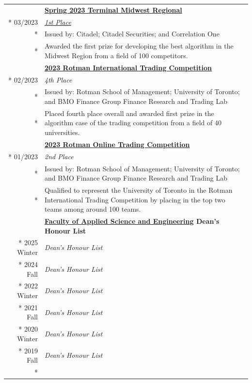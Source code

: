 \documentclass{article}
\begin{document}
	\begin{tabularx}{\textwidth}{r X}
		& \textbf{\href{https://terminal.c1games.com/}{Spring 2023 Terminal Midwest Regional}} \\*
		03/2023 & \textit{\href{https://www.credential.net/950d22c3-1b72-45d8-bf12-732c7ff54927}{1st Place}} \\*
		& {\small Issued by: Citadel; Citadel Securities; and Correlation One} \\*
		& {\small Awarded the first prize for developing the best algorithm in the Midwest Region from a field of 100 competitors.} \\
		\addlinespace
		& \textbf{\href{https://ritc.rotman.utoronto.ca/}{2023 Rotman International Trading Competition}} \\*
		02/2023 & \textit{4th Place} \\*
		& {\small Issued by: Rotman School of Management; University of Toronto; and BMO Finance Group Finance Research and Trading Lab} \\*
		& {\small Placed fourth place overall and awarded first prize in the algorithm case of the trading competition from a field of 40 universities.} \\
		\iftoggle{verbose}{
			\addlinespace
			& \textbf{\href{https://inside.rotman.utoronto.ca/financelab/}{2023 Rotman Online Trading Competition}} \\*
			01/2023 & \textit{2nd Place} \\*
			& {\small Issued by: Rotman School of Management; University of Toronto; and BMO Finance Group Finance Research and Trading Lab} \\*
			& {\small Qualified to represent the University of Toronto in the Rotman International Trading Competition by placing in the top two teams among around 100 teams.} \\
			\addlinespace
			& \textbf{\href{https://www.engineering.utoronto.ca/}{Faculty of Applied Science and Engineering} Dean's Honour List} \\*
			2025 Winter & \textit{Dean's Honour List} \\*
			2024 Fall & \textit{Dean's Honour List} \\*
			2022 Winter & \textit{Dean's Honour List} \\*
			2021 Fall & \textit{Dean's Honour List} \\*
			2020 Winter & \textit{Dean's Honour List} \\*
			2019 Fall & \textit{Dean's Honour List} \\*
}
\end{tabularx}
\end{document}
